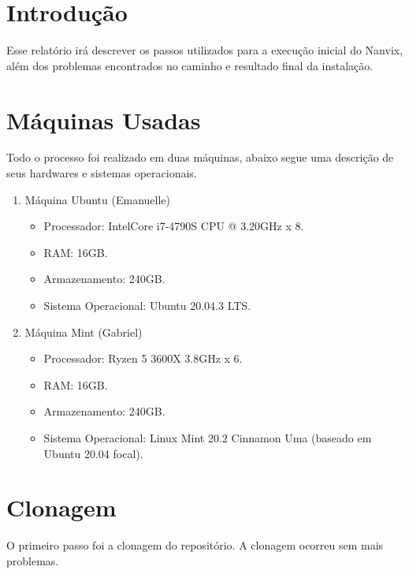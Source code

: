 \documentclass[12pt,
    oneside,
    brazil,
    sumario=tradicional,
    article,
    a4paper
]{abntex2}
\begin{document}
    \printcoverufsc

    \section{Introdução}\label{sec:introducao}

    Esse relatório irá descrever os passos utilizados para a execução inicial do Nanvix, além dos problemas encontrados no caminho e resultado final da instalação.

    \section{Máquinas Usadas}\label{sec:máquinas-usadas}

    Todo o processo foi realizado em duas máquinas, abaixo segue uma descrição de seus hardwares e sistemas operacionais.

    \begin{enumerate}
        \item Máquina Ubuntu (Emanuelle)\label{maquina-ubuntu}
            \begin{itemize}
                \item Processador: IntelCore i7-4790S CPU @ 3.20GHz x 8.
                \item RAM: 16GB.
                \item Armazenamento: 240GB.
                \item Sistema Operacional: Ubuntu 20.04.3 LTS.
            \end{itemize}
        \item Máquina Mint (Gabriel)\label{maquina-mint}
            \begin{itemize}
                \item Processador: Ryzen 5 3600X 3.8GHz x 6.
                \item RAM: 16GB.
                \item Armazenamento: 240GB.
                \item Sistema Operacional: Linux Mint 20.2 Cinnamon Uma (baseado em Ubuntu 20.04 focal).
            \end{itemize}
    \end{enumerate}

    \section{Clonagem}\label{sec:clonagem}

    O primeiro passo foi a clonagem do repositório. A clonagem ocorreu sem mais problemas.
    
\end{document}
